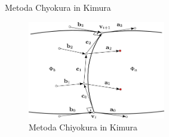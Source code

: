 \documentclass[a4paper,8pt]{beamer}
\begin{document}
\begin{frame}{Metoda Chyokura in Kimura}
	
\end{frame}
\begin{frame}
	\begin{figure}[h]
		\centering
		\includegraphics[width=6cm]{metoda_CinK.jpg}
		\caption{Metoda Chiyokura in Kimura}
	\end{figure}
\end{frame}
\end{document}
